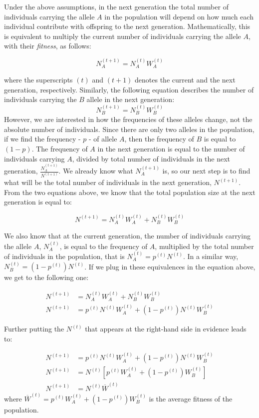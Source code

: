 \documentclass[
]{book}
\begin{document}
Under the above assumptions, in the next generation the total number of individuals carrying the allele \(A\) in the population will depend on how much each individual contribute with offspring to the next generation. Mathematically, this is equivalent to multiply the current number of individuals carrying the allele \(A\), with their \emph{fitness}, as follows:

\[N_{A}^{(t+1)}=N_{A}^{(t)}W_{A}^{(t)}\]

where the superscripts \((t)\) and \((t+1)\) denotes the current and the next generation, respectively. Similarly, the following equation describes the number of individuals carrying the \(B\) allele in the next generation: \[N_{B}^{(t+1)}=N_{B}^{(t)}W_{B}^{(t)}\] However, we are interested in how the frequencies of these alleles change, not the absolute number of individuals. Since there are only two alleles in the population, if we find the frequency - \(p\) - of allele \(A\), then the frequency of \(B\) is equal to \((1-p)\). The frequency of \(A\) in the next generation is equal to the number of individuals carrying \(A\), divided by total number of individuals in the next generation, \(\frac{N_{A}^{(t+1)}}{N^{(t+1)}}\). We already know what \(N_{A}^{(t+1)}\) is, so our next step is to find what will be the total number of individuals in the next generation, \(N^{(t+1)}\). From the two equations above, we know that the total population size at the next generation is equal to:

\[N^{(t+1)}=N_{A}^{(t)}W_{A}^{(t)}+N_{B}^{(t)}W_{B}^{(t)}\]

We also know that at the current generation, the number of individuals carrying the allele \(A\), \(N_{A}^{(t)}\), is equal to the frequency of \(A\), multiplied by the total number of individuals in the population, that is \(N_{A}^{(t)}=p^{(t)}N^{(t)}\). In a similar way, \(N_{B}^{(t)}=(1-p^{(t)})N^{(t)}\). If we plug in these equivalences in the equation above, we get to the following one:

\[
\begin{aligned}
N^{(t+1)}&=N_{A}^{(t)}W_{A}^{(t)}+N_{B}^{(t)}W_{B}^{(t)} \\
N^{(t+1)}&=p^{(t)}N^{(t)}W_{A}^{(t)}+(1-p^{(t)})N^{(t)}W_{B}^{(t)}
\end{aligned}
\]

Further putting the \(N^{(t)}\) that appears at the right-hand side in evidence leads to:

\[
\begin{aligned}
N^{(t+1)}&=p^{(t)}N^{(t)}W_{A}^{(t)}+(1-p^{(t)})N^{(t)}W_{B}^{(t)} \\
N^{(t+1)}&=N^{(t)}\left[p^{(t)}W_{A}^{(t)}+(1-p^{(t)})W_{B}^{(t)} \right] \\
N^{(t+1)}&=N^{(t)}\overline{W}^{(t)}
\end{aligned}
\] where \(\overline{W}^{(t)}=p^{(t)}W_{A}^{(t)}+(1-p^{(t)})W_{B}^{(t)}\) is the average fitness of the population.
\end{document}
